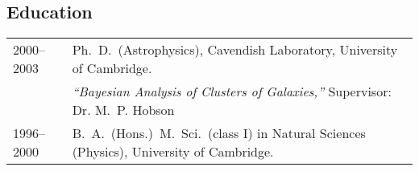 \subsection*{Education}

\begin{tabular}{@{}p{2.5cm}p{15.8cm}}
2000--2003  & Ph.\ D.\  (Astrophysics), Cavendish Laboratory,
              University of Cambridge.\\
            & \textit{``Bayesian Analysis of Clusters of Galaxies,''}\;\; Supervisor: Dr. M.~P. Hobson\\
1996--2000  & B.\ A.\ (Hons.)\, M.\ Sci.\ (class I) in Natural Sciences (Physics), University of Cambridge.
\end{tabular}
